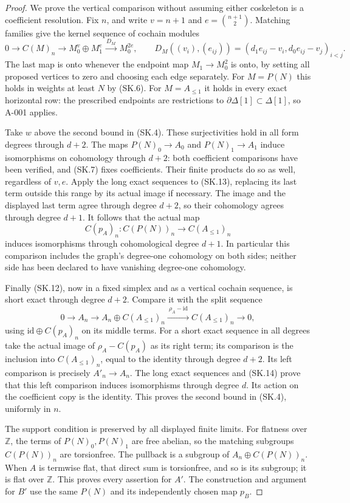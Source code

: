 \begin{proof}
We prove the vertical comparison without assuming either coskeleton
is a coefficient resolution. Fix $n$, and write $v=n+1$ and
$e=\binom{n+1}{2}$. Matching families give the kernel sequence
of cochain modules
\[
 0\longrightarrow C(M)_n\longrightarrow M_0^v\oplus M_1^e
 \xrightarrow{\ D_M\ }M_0^{2e},
 \qquad
 D_M((v_i),(e_{ij}))=(d_1e_{ij}-v_i,d_0e_{ij}-v_j)_{i<j}.
 \tag{SK.13}
\]
The last map is onto whenever the endpoint map $M_1\to M_0^2$
is onto, by setting all proposed vertices to zero and choosing
each edge separately.
For $M=P(N)$ this holds in weights at least $N$ by (SK.6).
For $M=A_{\leq1}$ it holds in every exact horizontal row:
the prescribed endpoints are restrictions to
$\partial\Delta[1]\subset\Delta[1]$, so A-001 applies.

Take $w$ above the second bound in (SK.4).
These surjectivities hold in all form degrees through $d+2$.
The maps $P(N)_0\to A_0$ and $P(N)_1\to A_1$ induce
isomorphisms on cohomology through $d+2$: both coefficient
comparisons have been verified, and (SK.7) fixes coefficients.
Their finite products do so as well, regardless of $v,e$.
Apply the long exact sequences to (SK.13), replacing its last
term outside this range by its actual image if necessary.
The image and the displayed last term agree through degree
$d+2$, so their cohomology agrees through degree $d+1$.
It follows that the actual map
\[
                    C(p_A)_n:C(P(N))_n\longrightarrow C(A_{\leq1})_n
 \tag{SK.14}
\]
induces isomorphisms through cohomological degree $d+1$.
In particular this comparison includes the graph's degree-one
cohomology on both sides; neither side has been declared to have
vanishing degree-one cohomology.

Finally (SK.12), now in a fixed simplex and as a vertical
cochain sequence, is short exact through degree $d+2$.
Compare it with the split sequence
\[
 0\to A_n\to A_n\oplus C(A_{\leq1})_n
                    \xrightarrow{\ \rho_A-\mathrm{id}\ }
                       C(A_{\leq1})_n\to0,
\]
using $\mathrm{id}\oplus C(p_A)_n$ on its middle terms.
For a short exact sequence in all degrees take the actual image
of $\rho_A-C(p_A)$ as its right term; its comparison is the
inclusion into $C(A_{\leq1})_n$, equal to the identity through
degree $d+2$. Its left comparison is precisely
$A'_n\to A_n$. The long exact sequences and (SK.14) prove
that this left comparison induces isomorphisms through degree
$d$. Its action on the coefficient copy is the identity.
This proves the second bound in (SK.4), uniformly in $n$.

The support condition is preserved by all displayed finite limits.
For flatness over $\mathbb Z$, the terms of $P(N)_0,P(N)_1$ are
free abelian, so the matching subgroups $C(P(N))_n$ are torsionfree.
The pullback is a subgroup of $A_n\oplus C(P(N))_n$.
When $A$ is termwise flat, that direct sum is torsionfree,
and so is its subgroup; it is flat over $\mathbb Z$.
This proves every assertion for $A'$.
The construction and argument for $B'$ use the same $P(N)$
and its independently chosen map $p_B$.
\end{proof}

